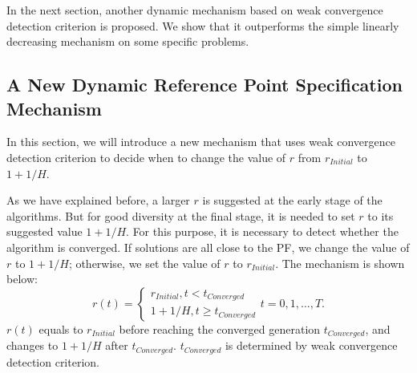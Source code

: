 \documentclass[conference]{IEEEtran}
\begin{document}
In the next section, another dynamic mechanism based on weak convergence detection criterion is proposed. 
We show that it outperforms the simple linearly decreasing mechanism on some specific problems. 

% 
\subsection{A New Dynamic Reference Point Specification Mechanism}
In this section,
we will introduce a new mechanism that uses weak convergence detection criterion to 
decide when to change the value of $r$ from $r_{Initial}$ to $1+1/H$. 

As we have explained before, 
a larger $r$ is suggested at the early stage of the algorithms. 
But for good diversity at the final stage,
it is needed to set $r$ to its suggested value $1+1/H$. 
For this purpose, it is necessary to detect whether the algorithm is converged. 
If solutions are all close to the PF, 
we change the value of $r$ to $1+1/H$; otherwise, we set the value of $r$ to 
$r_{Initial}$. The mechanism is shown below:
\begin{equation}\label{endm1}
  r(t)=
  \begin{cases}
    r_{Initial}, t<t_{Converged}\\
    1+1/H, t \ge t_{Converged} 
  \end{cases}
  t=0,1,\dots,T.
\end{equation}
$r(t)$ equals to $r_{Initial}$ before reaching the converged generation $t_{Converged}$, 
and changes to $1+1/H$ after $t_{Converged}$. 
$t_{Converged}$ is determined by weak convergence detection criterion. 
\end{document}

